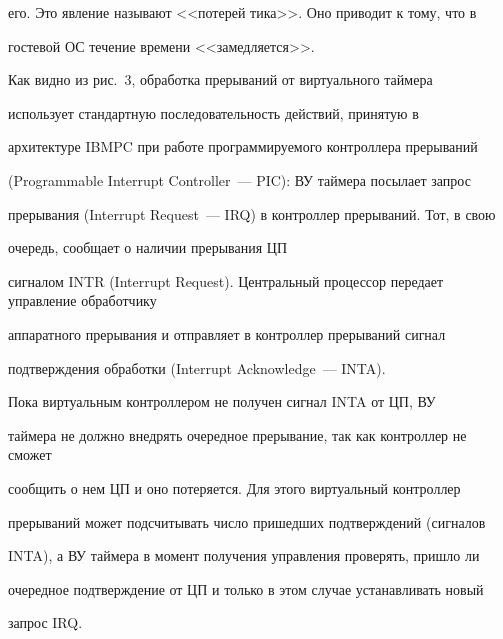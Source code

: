 его. Это явление называют <<потерей тика>>. Оно приводит к тому, что в 


гостевой ОС течение времени <<замедляется>>.





    


     Как видно из рис.~3, обработка прерываний от виртуального таймера 


использует стандартную последовательность действий, принятую в 


архитектуре IBMPC при работе программируемого контроллера прерываний 


(Programmable Interrupt Controller~--- PIC): ВУ таймера посылает запрос 


прерывания (Interrupt Request~--- IRQ) в контроллер прерываний. Тот, в свою 


очередь, сообщает о наличии прерывания ЦП 


сигналом INTR (Interrupt Request). Центральный процессор передает управление обработчику 


аппаратного прерывания и отправляет в контроллер прерываний сигнал 


подтверждения обработки (Interrupt Acknowledge~--- INTA).


     


     Пока виртуальным контроллером не получен сигнал INTA от ЦП, ВУ 


таймера не должно внедрять очередное прерывание, так как контроллер не сможет 


сообщить о нем ЦП и оно потеряется. Для этого виртуальный контроллер 


прерываний может подсчитывать число пришедших подтверждений (сигналов 


INTA), а ВУ таймера в момент получения управления проверять, пришло ли 


очередное подтверждение от ЦП и только в этом случае устанавливать новый 


запрос IRQ.





